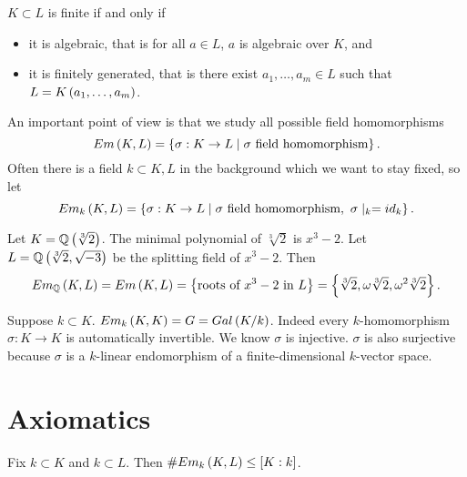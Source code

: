 \begin{remark*}
$ K \subset L $ is finite if and only if
\begin{itemize}
\item it is algebraic, that is for all $ a \in L $, $ a $ is algebraic over $ K $, and
\item it is finitely generated, that is there exist $ a_1, \dots, a_m \in L $ such that $ L = K\left( a_1, \dots, a_m \right) $.
\end{itemize}
\end{remark*}

An important point of view is that we study all possible field homomorphisms
$$ Em\left( K, L \right) = \left\{ \sigma : K \to L \mid \sigma \ \text{field homomorphism} \right\}. $$
Often there is a field $ k \subset K, L $ in the background which we want to stay fixed, so let
$$ Em_k\left( K, L \right) = \left\{ \sigma : K \to L \mid \sigma \ \text{field homomorphism}, \ \sigma \mid_k = id_k \right\}. $$

\begin{example*}
Let $ K = \mathbb{Q}\left( \sqrt[3]{2} \right) $. The minimal polynomial of $ \sqrt[3]{2} $ is $ x^3 - 2 $. Let $ L = \mathbb{Q}\left( \sqrt[3]{2}, \sqrt{-3} \right) $ be the splitting field of $ x^3 - 2 $. Then
$$ Em_{\mathbb{Q}}\left( K, L \right) = Em\left( K, L \right) = \left\{ \text{roots of} \ x^3 - 2 \ \text{in} \ L \right\} = \left\{ \sqrt[3]{2}, \omega\sqrt[3]{2}, \omega^2\sqrt[3]{2} \right\}. $$
\end{example*}

\begin{remark*}
Suppose $ k \subset K $. $ Em_k\left( K, K \right) = G = Gal\left( K / k \right) $. Indeed every $ k $-homomorphism $ \sigma : K \to K $ is automatically invertible. We know $ \sigma $ is injective. $ \sigma $ is also surjective because $ \sigma $ is a $ k $-linear endomorphism of a finite-dimensional $ k $-vector space.
\end{remark*}

\section{Axiomatics}

\begin{proposition}
\label{prop:1}
Fix $ k \subset K $ and $ k \subset L $. Then $ \#Em_k\left( K, L \right) \le \left[ K : k \right] $.
\end{proposition}

